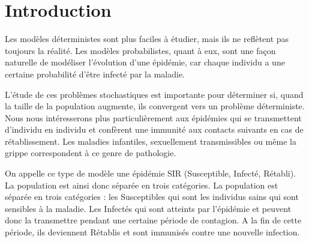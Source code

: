 \chapter{Introduction}

Les modèles déterministes sont plus faciles à étudier, mais ils ne reflètent pas toujours la réalité. Les modèles probabilistes, quant à eux, sont une façon naturelle de modéliser l’évolution d’une épidémie, car chaque individu a une certaine probabilité d’être infecté par la maladie.


L’étude de ces problèmes stochastiques est importante pour déterminer si, quand la taille de la population augmente, ils convergent vers un problème déterministe. Nous nous intéresserons plus particulièrement aux épidémies qui se transmettent d’individu en individu et confèrent une immunité aux contacts suivants en cas de rétablissement. Les maladies infantiles, sexuellement transmissibles ou même la grippe correspondent à ce genre de pathologie. 

On appelle ce type de modèle une épidémie SIR (Susceptible, Infecté, Rétabli). La population est ainsi donc séparée en trois catégories. La population est séparée en trois catégories : les Susceptibles qui sont les individus sains qui sont sensibles à la maladie. Les Infectés qui sont atteints par l’épidémie et peuvent donc la transmettre pendant une certaine période de contagion. A la fin de
cette période, ils deviennent Rétablis et sont immunisés contre une nouvelle infection.
